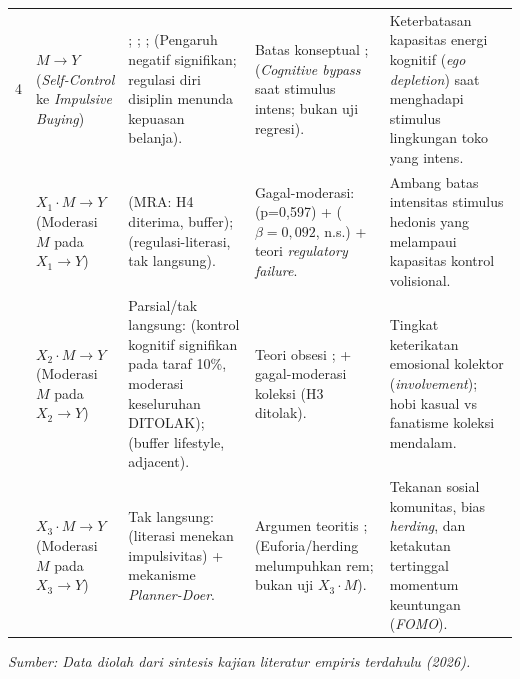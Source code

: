 \documentclass[12pt,a4paper]{article}
\numberwithin{equation}{section}
\numberwithin{table}{section}
\numberwithin{figure}{section}
\begin{document}
\begin{longtable}{p{} p{} p{} p{} p{}}
4 & $M \rightarrow Y$ (\emph{Self-Control} ke \emph{Impulsive Buying}) & \citet{baumeister2002yield}; \citet{tangney2004high}; \citet{vohs2007spent}; \citet{sultan2012building} (Pengaruh negatif signifikan; regulasi diri disiplin menunda kepuasan belanja). & Batas konseptual \citet{hirschman1982hedonic}; \citet{stern1962significance} (\emph{Cognitive bypass} saat stimulus intens; bukan uji regresi). & Keterbatasan kapasitas energi kognitif (\emph{ego depletion}) saat menghadapi stimulus lingkungan toko yang intens. \\
\addlinespace[4pt]
5 & $X_1 \cdot M \rightarrow Y$ (Moderasi $M$ pada $X_1 \rightarrow Y$) & \citet{lienardy2026role} (MRA: H4 diterima, buffer); \citet{katauke2023financial} (regulasi-literasi, tak langsung). & Gagal-moderasi: \citet{apidana2022peran} (p=0,597) + \citet{artadita2024how} ($\beta=0{,}092$, n.s.) + teori \emph{regulatory failure}. & Ambang batas intensitas stimulus hedonis yang melampaui kapasitas kontrol volisional. \\
\addlinespace[4pt]
6 & $X_2 \cdot M \rightarrow Y$ (Moderasi $M$ pada $X_2 \rightarrow Y$) & Parsial/tak langsung: \citet{artadita2024how} (kontrol kognitif signifikan pada taraf 10\%, moderasi keseluruhan DITOLAK); \citet{apidana2022peran} (buffer lifestyle, adjacent). & Teori obsesi \citet{belk1995collecting}; \citet{barasz2017pseudo} + gagal-moderasi koleksi \citet{artadita2024how} (H3 ditolak). & Tingkat keterikatan emosional kolektor (\emph{involvement}); hobi kasual vs fanatisme koleksi mendalam. \\
\addlinespace[4pt]
7 & $X_3 \cdot M \rightarrow Y$ (Moderasi $M$ pada $X_3 \rightarrow Y$) & Tak langsung: \citet{katauke2023financial} (literasi menekan impulsivitas) + mekanisme \emph{Planner-Doer}. & Argumen teoritis \citet{shiller2000irrational}; \citet{aryadi2024personal} (Euforia/herding melumpuhkan rem; bukan uji $X_3 \cdot M$). & Tekanan sosial komunitas, bias \emph{herding}, dan ketakutan tertinggal momentum keuntungan (\emph{FOMO}). \\
\end{longtable}
\vspace{-0.3cm}
\begin{flushleft}
  \footnotesize\textit{Sumber: Data diolah dari sintesis kajian literatur empiris terdahulu (2026).}
\end{flushleft}
\endgroup
\end{document}
